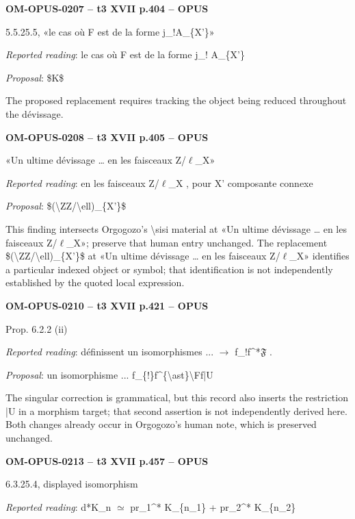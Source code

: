 \par\noindent\textbf{OM-OPUS-0207 -- t3 XVII p.404 -- OPUS}\par
5.5.25.5, «le cas où F est de la forme j\_!A\_\{X'\}»\par
\emph{Reported reading}: le cas où F est de la forme j\_! A\_\{X'\}\par
\emph{Proposal}: \$K\$\par
The proposed replacement requires tracking the object being reduced throughout the dévissage.\par
\par\noindent\textbf{OM-OPUS-0208 -- t3 XVII p.405 -- OPUS}\par
«Un ultime dévissage … en les faisceaux Z/\ensuremath{\ell}\_X»\par
\emph{Reported reading}: en les faisceaux Z/\ensuremath{\ell}\_X , pour X' composante connexe\par
\emph{Proposal}: \$(\textbackslash{}ZZ/\textbackslash{}ell)\_\{X'\}\$\par
This finding intersects Orgogozo's \textbackslash{}sisi material at «Un ultime dévissage … en les faisceaux Z/\ensuremath{\ell}\_X»; preserve that human entry unchanged. The replacement \$(\textbackslash{}ZZ/\textbackslash{}ell)\_\{X'\}\$ at «Un ultime dévissage … en les faisceaux Z/\ensuremath{\ell}\_X» identifies a particular indexed object or symbol; that identification is not independently established by the quoted local expression.\par
\par\noindent\textbf{OM-OPUS-0210 -- t3 XVII p.421 -- OPUS}\par
Prop. 6.2.2 (ii)\par
\emph{Reported reading}: définissent un isomorphismes ... \ensuremath{\to} f\_!f\textasciicircum{}*\ensuremath{𝔉} .\par
\emph{Proposal}: un isomorphisme ... f\_\{!\}f\textasciicircum{}\{\textbackslash{}ast\}\textbackslash{}Ff|U\par
The singular correction is grammatical, but this record also inserts the restriction |U in a morphism target; that second assertion is not independently derived here. Both changes already occur in Orgogozo's human note, which is preserved unchanged.\par
\par\noindent\textbf{OM-OPUS-0213 -- t3 XVII p.457 -- OPUS}\par
6.3.25.4, displayed isomorphism\par
\emph{Reported reading}: d*K\_n \ensuremath{\simeq} pr\_1\textasciicircum{}* K\_\{n\_1\} + pr\_2\textasciicircum{}* K\_\{n\_2\}\par
